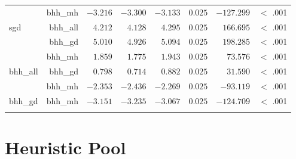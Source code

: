 \begin{table}[H]
{\begin{tabular}{lrrrrrrr}
			                     & bhh\_mh              & $-3.216$             & $-3.300$                                        & $-3.133$             & $0.025$              & $-127.299$           & $<$ .001    \\
			sgd                  & bhh\_all             & $4.212$              & $4.128$                                         & $4.295$              & $0.025$              & $166.695$            & $<$ .001    \\
			$ $                  & bhh\_gd              & $5.010$              & $4.926$                                         & $5.094$              & $0.025$              & $198.285$            & $<$ .001    \\
			                     & bhh\_mh              & $1.859$              & $1.775$                                         & $1.943$              & $0.025$              & $73.576$             & $<$ .001    \\
			bhh\_all             & bhh\_gd              & $0.798$              & $0.714$                                         & $0.882$              & $0.025$              & $31.590$             & $<$ .001    \\
			$ $                  & bhh\_mh              & $-2.353$             & $-2.436$                                        & $-2.269$             & $0.025$              & $-93.119$            & $<$ .001    \\
			bhh\_gd              & bhh\_mh              & $-3.151$             & $-3.235$                                        & $-3.067$             & $0.025$              & $-124.709$           & $<$ .001    \\
			\bottomrule
			\addlinespace[1ex]
		\end{tabular}
	}
\end{table}

\newpage
\section{Heuristic Pool}\label{app:statistical_analysis:bhh_variant_hp}

